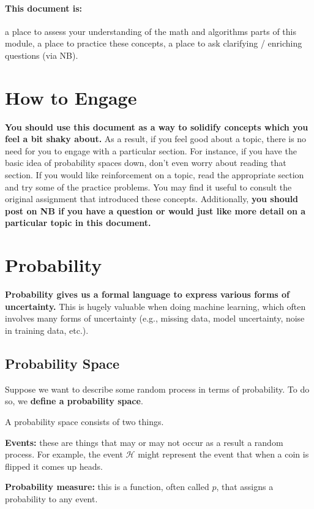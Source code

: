 \documentclass{tufte-handout}
\begin{document}
 \paragraph{\textbf{This document is:}} a place to assess your understanding of the math and algorithms parts of this module, a place to practice these concepts, a place to ask clarifying / enriching questions (via NB).

\section{How to Engage}

\textbf{You should use this document as a way to solidify concepts which you feel a bit shaky about.}  As a result, if you feel good about a topic, there is no need for you to engage with a particular section.  For instance, if you have the basic idea of probability spaces down, don't even worry about reading that section.  If you would like reinforcement on a topic, read the appropriate section and try some of the practice problems.  You may find it useful to consult the original assignment that introduced these concepts.  Additionally, \textbf{you should post on NB if you have a question or would just like more detail on a particular topic in this document.}


\section{Probability}

\textbf{Probability gives us a formal language to express various forms of uncertainty.}  This is hugely valuable when doing machine learning, which often involves many forms of uncertainty (e.g., missing data, model uncertainty, noise in training data, etc.).

\subsection{Probability Space}
Suppose we want to describe some random process in terms of probability.  To do so, we \textbf{define a probability space}.

A probability space consists of two things.
\bi
\item \textbf{Events:} these are things that may or may not occur as a result a random process.  For example, the event $\mathcal{H}$ might represent the event that when a coin is flipped it comes up heads.
\item \textbf{Probability measure:} this is a function, often called $p$, that assigns a probability to any event.
\end{document}
